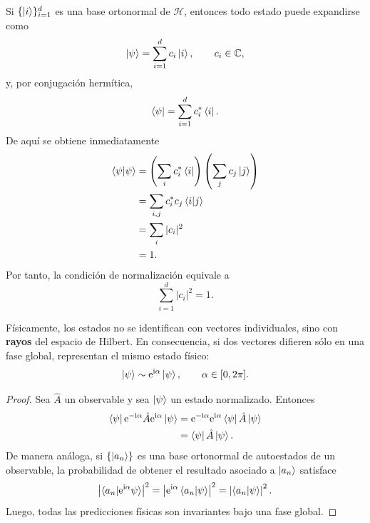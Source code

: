 \documentclass[12pt,a4paper]{article}
\theoremstyle{definition}
\theoremstyle{plain}
\theoremstyle{remark}
\newcommand{\C}{\mathbb{C}}
\newcommand{\Hil}{\mathcal{H}}
\newcommand{\ii}{\mathrm{i}}
\newcommand{\ee}{\mathrm{e}}
\providecommand{\op}[1]{\hat{#1}}
\begin{document}
Si $\{\ket{i}\}_{i=1}^{d}$ es una base ortonormal de $\Hil$, entonces todo estado puede expandirse como
\begin{equation*}
    \ket{\psi}=\sum_{i=1}^{d}c_i\ket{i},
    \qquad c_i\in\C,
\end{equation*}
y, por conjugación hermítica,
\begin{equation*}
    \bra{\psi}=\sum_{i=1}^{d}c_i^*\bra{i}.
\end{equation*}
De aquí se obtiene inmediatamente
\begin{align*}
    \braket{\psi|\psi}
    &=
    \left(\sum_i c_i^*\bra{i}\right)\left(\sum_j c_j\ket{j}\right)\\
    &=
    \sum_{i,j}c_i^*c_j\braket{i|j}\\
    &=
    \sum_i |c_i|^2\\
    &=
    1.
\end{align*}
Por tanto, la condición de normalización equivale a
\begin{equation*}
    \sum_{i=1}^{d}|c_i|^2=1.
\end{equation*}

Físicamente, los estados no se identifican con vectores individuales, sino con \textbf{rayos} del espacio de Hilbert. En consecuencia, si dos vectores difieren sólo en una fase global, representan el mismo estado físico:
\begin{equation*}
    \ket{\psi}\sim \ee^{\ii\alpha}\ket{\psi},
    \qquad \alpha\in[0,2\pi].
\end{equation*}

\begin{proof}
Sea $\op{A}$ un observable y sea $\ket{\psi}$ un estado normalizado. Entonces
\begin{align*}
    \bra{\psi}\ee^{-\ii\alpha}\op{A}\ee^{\ii\alpha}\ket{\psi}
    &=
    \ee^{-\ii\alpha}\ee^{\ii\alpha}\bra{\psi}\op{A}\ket{\psi}\\
    &=
    \bra{\psi}\op{A}\ket{\psi}.
\end{align*}
De manera análoga, si $\{\ket{a_n}\}$ es una base ortonormal de autoestados de un observable, la probabilidad de obtener el resultado asociado a $\ket{a_n}$ satisface
\begin{equation*}
    \left|\braket{a_n|\ee^{\ii\alpha}\psi}\right|^2
    =
    \left|\ee^{\ii\alpha}\braket{a_n|\psi}\right|^2
    =
    \left|\braket{a_n|\psi}\right|^2.
\end{equation*}
Luego, todas las predicciones físicas son invariantes bajo una fase global.
\end{proof}
\end{document}
